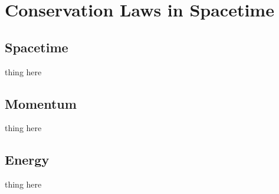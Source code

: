 \documentclass[../p023main.tex]{subfiles}
\begin{document}
\chapter{Conservation Laws in Spacetime}
\section{Spacetime}
thing here

\section{Momentum}
thing here

\section{Energy}
thing here
    
\end{document}
